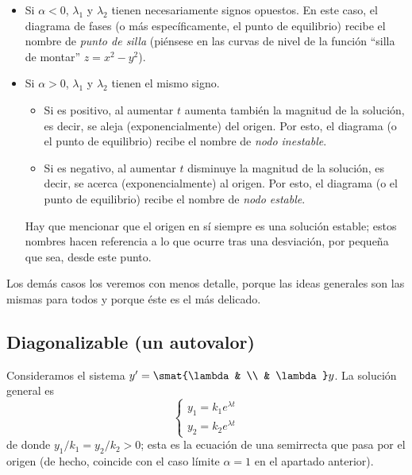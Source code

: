 \documentclass[../main.tex]{subfiles}
\begin{document}
\begin{itemize}
\item Si \(\alpha < 0\), \(\lambda_1\) y \(\lambda_2\) tienen necesariamente
  signos opuestos. En este caso, el diagrama de fases (o más específicamente, el
  punto de equilibrio) recibe el nombre de \emph{punto de silla} (piénsese en
  las curvas de nivel de la función ``silla de montar'' \(z = x^2 - y^2\)).
\item Si \(\alpha > 0\), \(\lambda_1\) y \(\lambda_2\) tienen el mismo signo.
  \begin{itemize}
  \item Si es positivo, al aumentar \(t\) aumenta también la magnitud de la
    solución, es decir, se aleja (exponencialmente) del origen. Por esto, el
    diagrama (o el punto de equilibrio) recibe el nombre de \emph{nodo
      inestable}.
  \item Si es negativo, al aumentar \(t\) disminuye la magnitud de la solución,
    es decir, se acerca (exponencialmente) al origen. Por esto, el diagrama (o
    el punto de equilibrio) recibe el nombre de \emph{nodo estable}.
  \end{itemize}
  Hay que mencionar que el origen en sí siempre es una solución estable; estos
  nombres hacen referencia a lo que ocurre tras una desviación, por pequeña que
  sea, desde este punto.
\end{itemize}

Los demás casos los veremos con menos detalle, porque las ideas generales son
las mismas para todos y porque éste es el más delicado.

\subsection{Diagonalizable (un autovalor)}

Consideramos el sistema \(y' = \smat{\lambda & \\ & \lambda} y\). La solución
general es
\[
  \begin{cases}
    y_1 = k_1e^{\lambda t} \\
    y_2 = k_2e^{\lambda t}
  \end{cases}
\]
de donde \(y_1/k_1 = y_2/k_2 > 0\); esta es la ecuación de una semirrecta que
pasa por el origen (de hecho, coincide con el caso límite \(\alpha = 1\) en el
apartado anterior).
\end{document}
